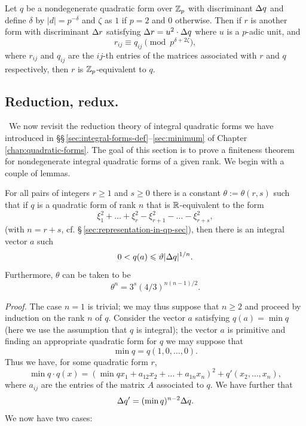 \begin{theoremx}\label{thm:approximation-zp}
    Let \(q\) be a nondegenerate quadratic form over \(\mathbb{Z}_p\) with discriminant \({\Delta} q\) and define \(\delta\) by \(|d| = p^{-\delta}\) and \(\zeta\) as \(1\) if \(p = 2\) and \(0\) otherwise. Then if \(r\) is another form with discriminant \({\Delta} r\) satisfying \({\Delta} r = u^2\cdot {\Delta} q\) where \(u\) is a \(p\)-adic unit, and
    \[
        r_{ij} \equiv q_{ij} \pmod{p^{\delta + 2\zeta}},  
    \]
    where \(r_{ij}\) and \(q_{ij}\) are the \(ij\)-th entries of the matrices associated with \(r\) and \(q\) respectively, then \(r\) is \(\mathbb{Z}_p\)-equivalent to \(q\).
\end{theoremx}

\subsection{Reduction, redux.}~We now revisit the reduction theory of integral quadratic forms we have introduced in \S\S\,\ref{sec:integral-forms-def}--\ref{sec:minimum} of Chapter\,\ref{chap:quadratic-forms}. The goal of this section is to prove a finiteness theorem for nondegenerate integral quadratic forms of a given rank. We begin with a couple of lemmas.\label{sec:integral-reduction-redux}

\begin{lemmax}\label{lemma:theta-inequality}
    {\normalfont\cite[p.\,136]{cassels2008rational}}
    For all pairs of integers \(r \geq 1\) and \(s \geq 0\) there is a constant \(\theta := \theta(r, s)\) such that if \(q\) is a quadratic form of rank \(n\) that is \(\mathbb{R}\)-equivalent to the form
    \[
        \xi_1^2 + \dots + \xi_r^2 - \xi_{r+1}^2 - \dots - \xi_{r+s}^2,
    \]
    (with \(n = r + s\), cf. \S\,\ref{sec:representation-in-qp-sec}), then there is an integral vector \(a\) such
    \[
        0 < q(a) \leqslant \vartheta |{\Delta} q|^{1/n}.
    \]
    Furthermore, \(\theta\) can be taken to be
    \begin{equation}
        \label{eq:theta-inequality}
        \theta^n = 3^s (4/3)^{n(n-1)/2}.
    \end{equation}
\end{lemmax}

\emph{Proof.} The case \(n = 1\) is trivial; we may thus suppose that \(n \geq 2\) and proceed by induction on the rank \(n\) of \(q\). Consider the vector \(a\) satisfying \(q(a) = \min q\) (here we use the assumption that \(q\) is integral); the vector \(a\) is primitive and finding an appropriate quadratic form for \(q\) we may suppose that
\[
    \min q = q(1, 0, \dots, 0).
\]
Thus we have, for some quadratic form \(r\),
\[
    \min q \cdot q(x) =(\min q x_1 + a_{12} x_2 + \dots + a_{1n} x_n)^2 + q'(x_2, \dots, x_n),
\]
where \(a_{ij}\) are the entries of the matrix \(A\) associated to \(q\). We have further that
\[
    {\Delta} q' = (\min q)^{n-2}{\Delta} q.
\]
We now have two cases:

